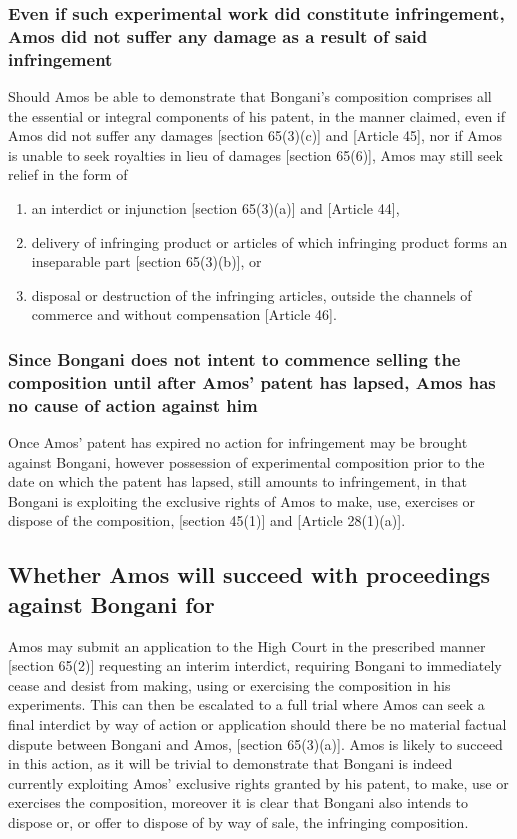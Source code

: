 \documentclass[11pt]{article}
\begin{document}
\subsubsection{Even if such experimental work did constitute infringement, Amos did not suffer any damage as a result of said infringement}
\label{sec:org76d14da}
Should Amos be able to demonstrate that Bongani's composition comprises all the
essential or integral components of his patent, in the manner claimed, even if
Amos did not suffer any
damages [section 65(3)(c)]\cite{rsa78_patents_act} and [Article
45]\cite{wto17_trips}, nor if Amos is unable to seek royalties in lieu of damages [section
65(6)]\cite{rsa78_patents_act}, Amos may still seek relief in the form
of
\begin{enumerate}
\item an interdict or injunction [section 65(3)(a)]\cite{rsa78_patents_act} and
[Article 44]\cite{wto17_trips},
\item delivery of infringing product or articles of which infringing product
forms an inseparable part [section 65(3)(b)]\cite{rsa78_patents_act}, or
\item disposal or destruction of the infringing articles, outside the channels of commerce and without compensation [Article 46]\cite{wto17_trips}.
\end{enumerate}
\subsubsection{Since Bongani does not intent to commence selling the composition until after Amos' patent has lapsed, Amos has no cause of action against him}
\label{sec:org6dd10ae}
Once Amos' patent has expired no action for infringement may be brought against
Bongani, however possession of experimental composition prior to the date on
which the patent has lapsed, still amounts to infringement, in that Bongani is
exploiting the exclusive rights of Amos to make, use, exercises or dispose of
the composition, [section 45(1)]\cite{rsa78_patents_act}
and [Article 28(1)(a)]\cite{wto17_trips}.
\subsection{Whether Amos will succeed with proceedings against Bongani for}
\label{sec:org1695d32}
Amos may submit an application to the High Court in the prescribed manner
[section 65(2)]\cite{rsa78_patents_act} requesting an interim
interdict, requiring Bongani to immediately cease and desist from making, using or
exercising the composition in his experiments. This can then be escalated to a
full trial where Amos can seek a final interdict by way of action or application
should there be no material factual dispute between Bongani and Amos, [section
65(3)(a)]\cite{rsa78_patents_act}. Amos is likely to succeed in this action, as it
will be trivial to demonstrate that Bongani is indeed currently exploiting Amos'
exclusive rights granted by his patent, to make, use or exercises the
composition, moreover it is clear that Bongani also intends to dispose or, or
offer to dispose of by way of sale, the infringing composition.\\
\end{document}
